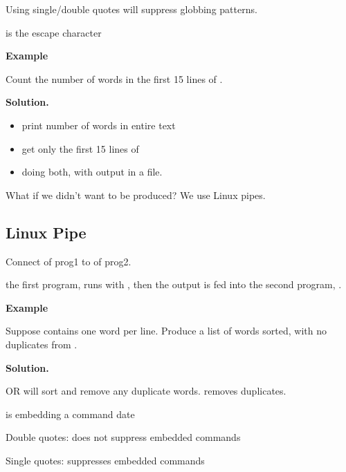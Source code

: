 Using single/double quotes will suppress globbing patterns.

\code{\textbackslash} is the escape character

\textbf{Example}

Count the number of words in the first 15 lines of .

\textbf{Solution.}

\begin{itemize}
      \item {} \textrightarrow{} print number of words in entire text
      \item {} \textrightarrow{} get only the first 15 lines
            of 
      \item {} \textrightarrow{}
            doing both, with output in a  file.
\end{itemize}

What if we didn't want  to be produced? We use Linux pipes.

\subsection{Linux Pipe}
Connect  of prog1 to  of prog2.

 \textrightarrow{}
the first program,  runs with , then the output is fed into
the second program, .

\textbf{Example}

Suppose  contains one word per line. Produce
a list of words sorted, with no duplicates from .

\textbf{Solution.}

 OR
 \textrightarrow{}  will sort
and remove any duplicate words.  removes duplicates.

 \textrightarrow{}
 is embedding a command date

Double quotes: does not suppress embedded commands

Single quotes: suppresses embedded commands
